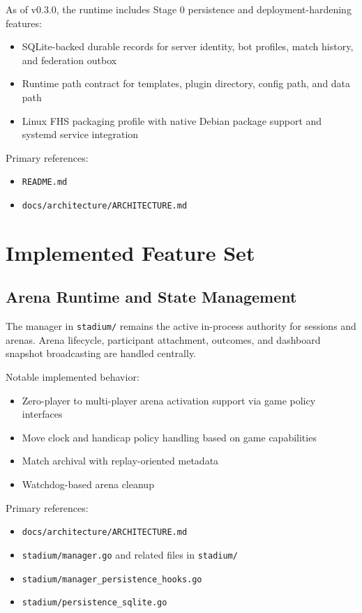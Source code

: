 \documentclass[11pt]{article}
\begin{document}
As of v0.3.0, the runtime includes Stage 0 persistence and deployment-hardening features:
\begin{itemize}[leftmargin=*]
  \item SQLite-backed durable records for server identity, bot profiles, match history, and federation outbox
  \item Runtime path contract for templates, plugin directory, config path, and data path
  \item Linux FHS packaging profile with native Debian package support and systemd service integration
\end{itemize}

Primary references:
\begin{itemize}[leftmargin=*]
  \item \texttt{README.md}
  \item \texttt{docs/architecture/ARCHITECTURE.md}
\end{itemize}

\section{Implemented Feature Set}
\subsection{Arena Runtime and State Management}
The manager in \texttt{stadium/} remains the active in-process authority for sessions and arenas. Arena lifecycle, participant attachment, outcomes, and dashboard snapshot broadcasting are handled centrally.

Notable implemented behavior:
\begin{itemize}[leftmargin=*]
  \item Zero-player to multi-player arena activation support via game policy interfaces
  \item Move clock and handicap policy handling based on game capabilities
  \item Match archival with replay-oriented metadata
  \item Watchdog-based arena cleanup
\end{itemize}

Primary references:
\begin{itemize}[leftmargin=*]
  \item \texttt{docs/architecture/ARCHITECTURE.md}
  \item \texttt{stadium/manager.go} and related files in \texttt{stadium/}
  \item \texttt{stadium/manager\_persistence\_hooks.go}
  \item \texttt{stadium/persistence\_sqlite.go}
\end{itemize}
\end{document}
